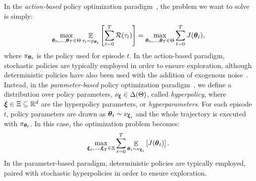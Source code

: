 \documentclass{article}
\begin{document}
In the \textit{action-based} policy optimization paradigm~\citep{peters2008reinforcement}, the problem we want to solve is simply:
\begin{align}\label{eq:Jtheta}
	\max_{\boldsymbol{\theta}_0,\dots,\boldsymbol{\theta}_T\in\Theta} \mathop{\mathbb{E}}_{\tau_t\sim p_{\boldsymbol{\theta}_t}}\left[\sum_{t=0}^T\mathcal{R}(\tau_t)\right] = 
	\max_{\boldsymbol{\theta}_0,\dots,\boldsymbol{\theta}_T\in\Theta} \sum_{t=0}^TJ(\boldsymbol{\theta}_t),
\end{align}
where $\pi_{\boldsymbol{\theta}_t}$ is the policy used for episode $t$.
In the action-based paradigm, stochastic policies are typically employed in order to ensure exploration, although deterministic policies have also been used with the addition of exogenous noise~\citep{silver2014deterministic}.
Instead, in the \textit{parameter-based} policy optimization paradigm~\citep{sehnke2008policy}, we define a distribution over policy parameters, $\nu_{\boldsymbol{\xi}}\in\Delta(\Theta)$, called \textit{hyperpolicy}, where $\boldsymbol{\xi}\in\Xi\subseteq\mathbb{R}^d$ are the hyperpolicy parameters, or \textit{hyperparameters}. For each episode $t$, policy parameters are drawn as $\boldsymbol{\theta}_t\sim\nu_{\boldsymbol{\xi}_t}$ and the whole trajectory is executed with $\pi_{\boldsymbol{\theta}_t}$. In this case, the optimization problem becomes:
\begin{align}\label{eq:Jx}
	\max_{\boldsymbol{\xi}_0,\dots,\boldsymbol{\xi}_T\in\Xi} \sum_{t=0}^T\mathop{\mathbb{E}}_{\boldsymbol{\theta}_t\sim\nu_{\boldsymbol{\xi}_t}}\left[J(\boldsymbol{\theta}_t)\right].
\end{align}
In the parameter-based paradigm, deterministic policies are typically employed, paired with stochastic hyperpolicies in order to ensure exploration.
\end{document}
